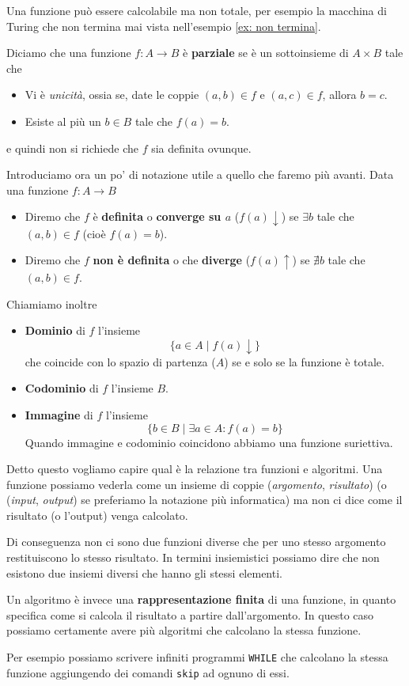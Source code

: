 Una funzione può essere calcolabile ma non totale, per esempio
la macchina di Turing che non termina mai vista nell'esempio
\ref{ex: non termina}.

\begin{definition} \label{def: funzione parziale}
	Diciamo che una funzione $f : A \to B$ è \textbf{parziale}
	se è un sottoinsieme di $A \times B$ tale che
	\begin{itemize}
		\item Vi è \emph{unicità}, ossia se, date le coppie
		      $(a, b) \in f$ e $(a, c) \in f$, allora $b = c$.
		\item Esiste al più un $b \in B$ tale che $f(a) = b$.
	\end{itemize}
	e quindi non si richiede che $f$ sia definita ovunque.
\end{definition}

Introduciamo ora un po' di notazione utile a quello che faremo
più avanti. Data una funzione $f : A \to B$
\begin{itemize}
	\item Diremo che $f$ è \textbf{definita} o
	      \textbf{converge su $a$} ($f(a) \downarrow$) se
	      $\exists b$ tale che $(a, b) \in f$ (cioè
	      $f(a) = b$).
	\item Diremo che $f$ \textbf{non è definita} o che
	      \textbf{diverge} ($f(a) \uparrow$) se $\nexists b$
	      tale che $(a, b) \in f$.
\end{itemize}
Chiamiamo inoltre
\begin{itemize}
	\item \textbf{Dominio} di $f$ l'insieme
	      \[ \{ a \in A \; | \; f(a) \downarrow \} \]
	      che coincide con lo spazio di partenza ($A$) se e
	      solo se la funzione è totale.
	\item \textbf{Codominio} di $f$ l'insieme $B$.
	\item \textbf{Immagine} di $f$ l'insieme
	      \[ \{ b \in B \; | \; \exists a \in A : f(a) = b \} \]
	      Quando immagine e codominio coincidono abbiamo una
	      funzione suriettiva.
\end{itemize}

Detto questo vogliamo capire qual è la relazione tra funzioni
e algoritmi. Una funzione possiamo vederla come un insieme di
coppie (\emph{argomento}, \emph{risultato}) (o (\emph{input},
\emph{output}) se preferiamo la notazione più informatica) ma
non ci dice come il risultato (o l'output) venga calcolato.

Di conseguenza non ci sono due funzioni diverse che per uno
stesso argomento restituiscono lo stesso risultato. In termini
insiemistici possiamo dire che non esistono due insiemi diversi
che hanno gli stessi elementi.
\begin{tcolorbox}
	Un algoritmo è invece una \textbf{rappresentazione finita}
	di una funzione, in quanto specifica come si calcola il
	risultato a partire dall'argomento. In questo caso possiamo
	certamente avere più algoritmi che calcolano la stessa
	funzione.
\end{tcolorbox}
Per esempio possiamo scrivere infiniti programmi \verb|WHILE|
che calcolano la stessa funzione aggiungendo dei comandi
\verb|skip| ad ognuno di essi.